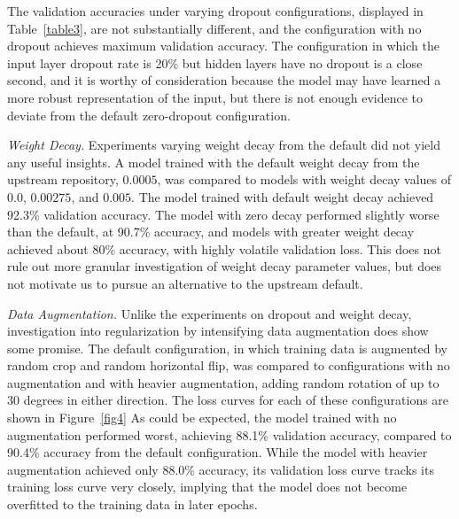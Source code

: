 \documentclass[letterpaper]{article} %
\begin{document}
The validation accuracies under varying dropout configurations, displayed in Table~\ref{table3},
are not substantially different, and the configuration with no dropout achieves maximum validation accuracy.
The configuration in which the input layer dropout rate is 20\% but hidden layers have no dropout
is a close second, and it is worthy of consideration because the model may have learned a more robust
representation of the input, but there is not enough evidence to deviate from the default zero-dropout
configuration.

\textit{Weight Decay.} Experiments varying weight decay from the default did not yield any useful insights.
A model trained with the default weight decay from the upstream repository, $0.0005 $,
was compared to models with weight decay values of $ 0.0 $, $ 0.00275 $, and $ 0.005 $.
The model trained with default weight decay achieved 92.3\% validation accuracy.
The model with zero decay performed slightly worse than the default, at 90.7\% accuracy, and
models with greater weight decay achieved about 80\% accuracy, with highly volatile validation
loss.
This does not rule out more granular investigation of weight decay parameter values, but does not
motivate us to pursue an alternative to the upstream default.

\textit{Data Augmentation.} Unlike the experiments on dropout and weight decay, investigation into regularization by
intensifying data augmentation does show some promise.
The default configuration, in which training data is augmented by random crop and random horizontal flip,
was compared to configurations with no augmentation and with heavier augmentation,
adding random rotation of up to 30 degrees in either direction.
The loss curves for each of these configurations are shown in Figure~\ref{fig4}
As could be expected, the model trained with no augmentation performed worst,
achieving 88.1\% validation accuracy, compared to 90.4\% accuracy from the default configuration.
While the model with heavier augmentation achieved only 88.0\% accuracy, its
validation loss curve tracks its training loss curve very closely, implying that
the model does not become overfitted to the training data in later epochs.
\end{document}
